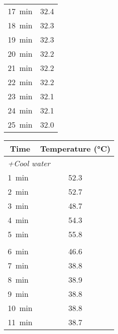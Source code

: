 \documentclass[11pt, titlepage]{article}
\begin{document}
\begin{center}
\begin{minipage}[t]{2in}
\begin{tabular}{l c}
                    \SI{17}{\minute} & 32.4 \\
                    \SI{18}{\minute} & 32.3 \\
                    \SI{19}{\minute} & 32.3 \\
                    \SI{20}{\minute} & 32.2 \\
                    \SI{21}{\minute} & 32.2 \\
                    \SI{22}{\minute} & 32.2 \\
                    \SI{23}{\minute} & 32.1 \\
                    \SI{24}{\minute} & 32.1 \\
                    \SI{25}{\minute} & 32.0 \\
                    \bottomrule
                \end{tabular}
            \end{minipage}
            \hspace{8pt}
            \begin{minipage}[t]{2in}
                \centering
                \label{tab:raw-partB}
                \begin{tabular}{l c}
                    \toprule
                    \multicolumn{1}{c}{Time} & Temperature (\si{\degreeCelsius}) \\
                    \midrule
                    \multicolumn{2}{l}{\textit{+Cool water}} \\
                    \SI{1}{\minute} & 52.3 \\
                    \SI{2}{\minute} & 52.7 \\
                    \SI{3}{\minute} & 48.7 \\
                    \SI{4}{\minute} & 54.3 \\
                    \SI{5}{\minute} & 55.8 \\
                    \addlinespace
                    \multicolumn{2}{l}{\textit{+Warm water}} \\
                    \SI{6}{\minute} & 46.6 \\
                    \SI{7}{\minute} & 38.8 \\
                    \SI{8}{\minute} & 38.9 \\
                    \SI{9}{\minute} & 38.8 \\
                    \SI{10}{\minute} & 38.8 \\
                    \SI{11}{\minute} & 38.7 \\

\end{tabular}
\end{minipage}
\end{center}
\end{document}
